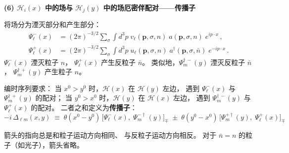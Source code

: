 \bigskip\noindent
\textbf{(6) $\mathscr{H}_i(x)$ 中的场与 $\mathscr{H}_j(y)$
  中的场厄密伴配对——传播子}

将场分为湮灭部分和产生部分：
\begin{align}
\Psi_\ell^{-}(x) &= (2\pi)^{-3/2}\sum_\sigma\int d^3p\;
  v_\ell(\boldsymbol{p},\sigma,n)\;a(\boldsymbol{p},\sigma,n)\;e^{ip\cdot x}\,,
\label{eq:psi-ann}\\[4pt]
\Psi_\ell^{+}(x) &= (2\pi)^{-3/2}\sum_\sigma\int d^3p\;
  u_\ell(\boldsymbol{p},\sigma,n)\;a^\dagger(\boldsymbol{p},\sigma,\bar{n})\;e^{-ip\cdot x}\,.
\label{eq:psi-cre}
\end{align}
$\Psi_\ell^{-}(x)$ 湮灭粒子 $n$，
$\Psi_\ell^{+}(x)$ 产生反粒子 $\bar{n}$。
类似地，$\Psi_m^{\dagger\,-}(y)$ 湮灭反粒子 $\bar{n}$，
$\Psi_m^{\dagger\,+}(y)$ 产生粒子 $n$。
\medskip



编时序列要求：
当 $x^0>y^0$ 时，$\mathscr{H}(x)$ 在 $\mathscr{H}(y)$ 左边，
遇到 $\Psi_\ell^{-}(x)$ 与 $\Psi_m^{\dagger\,+}(y)$ 的配对；
当 $y^0>x^0$ 时，$\mathscr{H}(y)$ 在 $\mathscr{H}(x)$ 左边，
遇到 $\Psi_m^{\dagger\,-}(y)$ 与 $\Psi_\ell^{+}(x)$ 的配对。
二者之和定义为\textbf{传播子}：
\begin{equation}
        -i\,\Delta_{\ell m}(x,y)
        \;\equiv\;
        \theta(x^0\!-y^0)\,
        \big[\Psi_\ell^{-}(x),\;\Psi_m^{-\dagger\,}(y)\big]_\mp
        \;\pm\;
        \theta(y^0\!-x^0)\,
        \big[\Psi_m^{+\dagger}(y),\;\Psi_\ell^{+}(x)\big]_\mp
        \label{eq:propagator}
\end{equation}

\begin{center}
\end{center}

\noindent
箭头的指向总是和粒子运动方向相同、
与反粒子运动方向相反。
对于 $\bar{n}=n$ 的粒子（如光子），箭头省略。
\medskip




